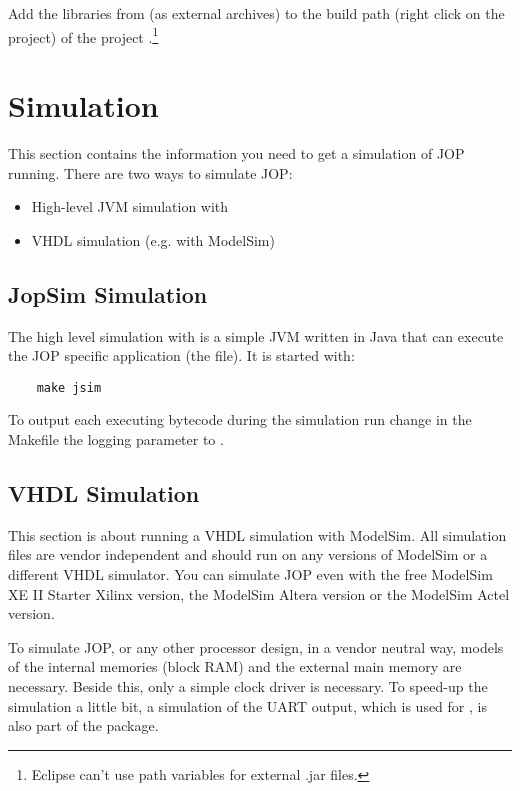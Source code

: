 Add the libraries from  (as external
archives) to the build path (right click on the 
project) of the project .\footnote{Eclipse can't use
path variables for external .jar files.}

\section{Simulation}

This section contains the information you need to get a simulation
of JOP running. There are two ways to simulate JOP:
%
{\samepage
\begin{itemize}
    \item High-level JVM simulation with 
    \item VHDL simulation (e.g. with ModelSim)
\end{itemize}
}
%

\subsection{JopSim Simulation}


The high level simulation with  is a simple JVM written
in Java that can execute the JOP specific application (the
 file). It is started with:
\begin{lstlisting}
    make jsim
\end{lstlisting}

To output each executing bytecode during the simulation run change in
the Makefile the logging parameter to .


\subsection{VHDL Simulation}


This section is about running a VHDL simulation with ModelSim. All
simulation files are vendor independent and should run on any
versions of ModelSim or a different VHDL simulator. You can simulate
JOP even with the free ModelSim XE II Starter Xilinx version, the
ModelSim Altera version or the ModelSim Actel version.

To simulate JOP, or any other processor design, in a vendor neutral
way, models of the internal memories (block RAM) and the external
main memory are necessary. Beside this, only a simple clock driver is
necessary. To speed-up the simulation a little bit, a simulation of
the UART output, which is used for , is also
part of the package.

